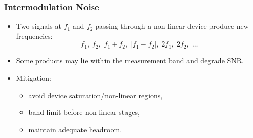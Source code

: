 \begin{frame}
	\frametitle{Intermodulation Noise}
	\begin{itemize}
		\item Two signals at $f_1$ and $f_2$ passing through a non-linear device produce new frequencies:
		\begin{equation}
			f_1,\; f_2,\; f_1+f_2,\; |f_1-f_2|,\; 2f_1,\; 2f_2,\; \dots
		\end{equation}
		\item Some products may lie within the measurement band and degrade SNR.
		\item Mitigation:
		\begin{itemize}
			\item avoid device saturation/non-linear regions,
			\item band-limit before non-linear stages,
			\item maintain adequate headroom.
		\end{itemize}
	\end{itemize}
\end{frame}

